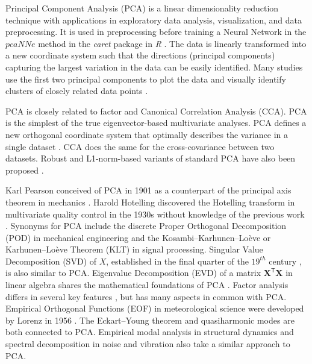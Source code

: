 \documentclass[sn-mathphys-num]{sn-jnl}%
\begin{document}
Principal Component Analysis (PCA) is a linear dimensionality reduction technique with applications in exploratory data analysis, visualization, and data preprocessing. It is used in preprocessing before training a Neural Network in the $pcaNNe$ method in the \textit{caret} package in \textit{R} \cite{ripley2007pattern}. The data is linearly transformed into a new coordinate system such that the directions (principal components) capturing the largest variation in the data can be easily identified. Many studies use the first two principal components to plot the data and visually identify clusters of closely related data points \cite{jolliffe2016principal}.

PCA is closely related to factor and Canonical Correlation Analysis (CCA). PCA is the simplest of the true eigenvector-based multivariate analyses. PCA defines a new orthogonal coordinate system that optimally describes the variance in a single dataset \cite{barnett1987origins, hsu2012spectral, markopoulos2017efficient, chachlakis2019l1}. CCA does the same for the cross-covariance between two datasets. Robust and L1-norm-based variants of standard PCA have also been proposed \cite{chachlakis2019l1, markopoulos2014optimal, zhan2015robust, ke2005robust}.

Karl Pearson \cite{pearson1901liii} conceived of PCA in 1901 as a counterpart of the principal axis theorem in mechanics \cite{stewart2019introduction}. Harold Hotelling discovered the Hotelling transform in multivariate quality control in the 1930s without knowledge of the previous work \cite{hotelling1933analysis, hotelling1992relations}. Synonyms for PCA include the discrete Proper Orthogonal Decomposition (POD) \cite{berkooz1993proper, karhunen1946spektraltheorie, loeve1977elementary, sirovich1987turbulence} in mechanical engineering and the Kosambi–Karhunen–Loève or Karhunen–Loève Theorem (KLT) \cite{sapatnekar2011overcoming, ghoman2012pod, archiveKarhunenLoeveTransform, giambartolomei2016, mallat1999wavelet, tang1998texture} in signal processing. Singular Value Decomposition (SVD) of $X$, established in the final quarter of the $19^{th}$ century \cite{stewart1993early}, is also similar to PCA. Eigenvalue Decomposition (EVD) of a matrix $\mathbf{X}^{\mathsf{T}}\mathbf{X}$ in linear algebra shares the mathematical foundations of PCA \cite{gloub1996matrix, hayden2002observations}. Factor analysis differs in several key features \cite{jolliffe2002principal}, but has many aspects in common with PCA. Empirical Orthogonal Functions (EOF) \cite{lorenz1956empirical} in meteorological science were developed by Lorenz in 1956 \cite{lorenz1956empirical}. The Eckart–Young theorem \cite{eckart1936approximation} and quasiharmonic modes \cite{dove1993introduction} are both connected to PCA. Empirical modal analysis in structural dynamics and spectral decomposition in noise and vibration also take a similar approach to PCA.
\end{document}
